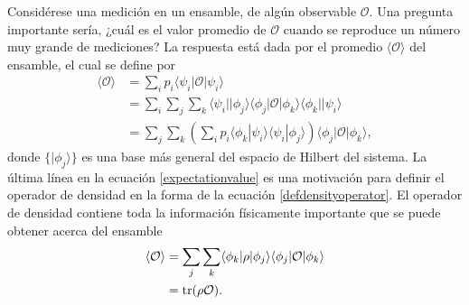 Considérese una medición en un ensamble, de algún observable $\mathcal{O}$. Una
pregunta importante sería, ¿cuál es el valor promedio de $\mathcal{O}$ cuando
se reproduce un número muy grande de mediciones? La respuesta está dada por el
promedio $\langle \mathcal{O} \rangle$ del ensamble, el cual se define por
{\cite{sakurai2017modern}} \begin{equation}
 	\label{expectationvalue}
 	 \begin{split}
 		\langle \mathcal{O} \rangle &= \sum_{i}p_i \langle\psi_i|\mathcal{O}|\psi_i\rangle\\
 		&=\sum_i\sum_{j}\sum_k \langle\psi_i||\phi_j\rangle \langle \phi_j|\mathcal{O}|\phi_k\rangle \langle \phi_k||\psi_i\rangle\\
 		&=\sum_{j}\sum_k \left(\sum_{i} p_i \langle \phi_k|\psi_i\rangle  \langle\psi_i|\phi_j\rangle\right) \langle \phi_j|\mathcal{O}|\phi_k\rangle, 
 	\end{split}
\end{equation} donde $\{|\phi_j\rangle \}$ es una base más general del espacio de Hilbert del sistema. La última línea en la ecuación {\ref{expectationvalue}} es una
motivación para  definir el operador de densidad  en la forma de la ecuación
{\ref{defdensityoperator}}. El operador de densidad contiene toda la
información físicamente importante que se puede obtener acerca del ensamble
{\cite{sakurai2017modern}}\begin{equation}
 	\label{expectationvalue_traza}
 	\begin{split}
 		\langle \mathcal{O} \rangle &=\sum_{j}\sum_k \langle \phi_k|\rho|\phi_j\rangle \langle \phi_j|\mathcal{O}|\phi_k\rangle\\
 		&= \rm{tr}(\rho \mathcal{O}).
 	\end{split}
\end{equation}

